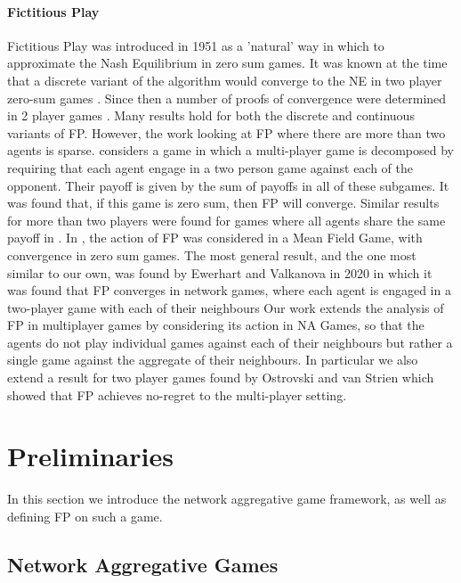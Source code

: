 \documentclass{article}
\theoremstyle{definition}
\begin{document}
\paragraph{Fictitious Play}

Fictitious Play was introduced in 1951 \cite{Brown1949} as a 'natural'
way in which to approximate the Nash Equilibrium in zero sum games. It
was known at the time that a discrete variant of the algorithm would
converge to the NE in two player zero-sum games
\cite{Robinson1951}. Since then a number of proofs of convergence were
determined in 2 player games \cite{Miyasawa1961, Metrick1994,
  Berger2007, Monderer1997, Monderer1996}. Many results hold for both
the discrete and continuous variants of FP. However, the work looking
at FP where there are more than two agents is sparse. \cite{Sela1999}
considers a game in which a multi-player game is decomposed by
requiring that each agent engage in a two person game against each of
the opponent. Their payoff is given by the sum of payoffs in all of
these subgames. It was found that, if this game is zero sum, then FP
will converge. Similar results for more than two players were found
for games where all agents share the same payoff in
\cite{Monderer1996}. In \cite{Perrin2020}, the action of FP was
considered in a Mean Field Game, with convergence in zero sum
games. The most general result, and the one most similar to our own,
was found by Ewerhart and Valkanova in 2020 \cite{Ewerhart2020} in
which it was found that FP converges in network games, where each
agent is engaged in a two-player game with each of their neighbours
Our work extends the analysis of FP in multiplayer games by
considering its action in NA Games, so that the agents do not play
individual games against each of their neighbours but rather a single
game against the aggregate of their neighbours. In particular we also
extend a result for two player games found by Ostrovski and van Strien
\cite{Ostrovski2014} which showed that FP achieves no-regret to the
multi-player setting.

\section{Preliminaries}
In this section we introduce the network aggregative game framework,
as well as defining FP on such a game.

\subsection{Network Aggregative Games}
\label{sec::NAG}
\end{document}
